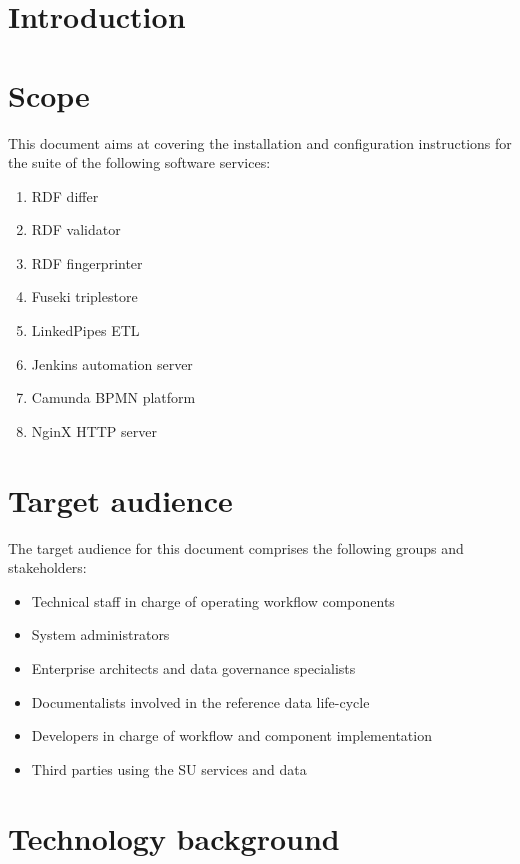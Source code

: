 \section{Introduction}
\label{sec:introduction}	


\section{Scope}
\label{sec:scope}

	This document aims at covering the installation and configuration instructions for the suite of the following software services:
	
	\begin{enumerate}
		\item RDF differ
		\item RDF validator
		\item RDF fingerprinter
		\item Fuseki triplestore
		\item LinkedPipes ETL
		\item Jenkins automation server
		\item Camunda BPMN platform
		\item NginX HTTP server
	\end{enumerate}


\section{Target audience}
\label{sec:audience}
	
	The target audience for this document comprises the following groups and stakeholders:	
	\begin{itemize}
		\item Technical staff in charge of operating workflow components
		\item System administrators
		\item Enterprise architects and data governance specialists
		\item Documentalists involved in the reference data life-cycle
		\item Developers in charge of workflow and component implementation
		\item Third parties using the SU services and data 
	\end{itemize}	
		
\section{Technology background}
\label{sec:background}

